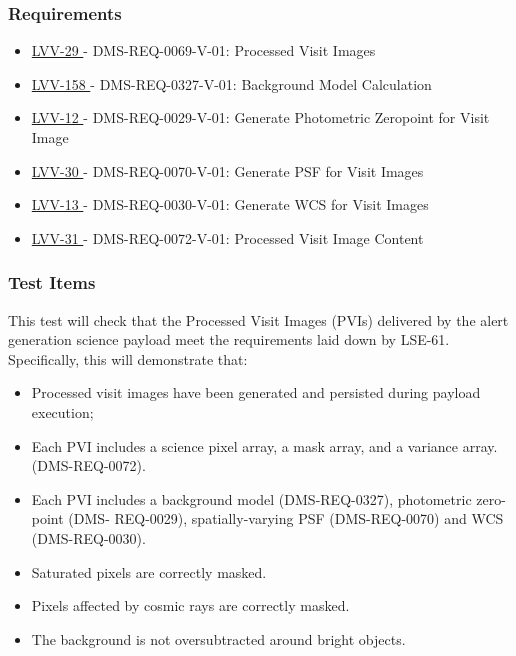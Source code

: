 \subsubsection{Requirements}

\begin{itemize}

\item \href{https://jira.lsstcorp.org/browse/LVV-29}{ LVV-29 } - DMS-REQ-0069-V-01: Processed Visit Images

\item \href{https://jira.lsstcorp.org/browse/LVV-158}{ LVV-158 } - DMS-REQ-0327-V-01: Background Model Calculation

\item \href{https://jira.lsstcorp.org/browse/LVV-12}{ LVV-12 } - DMS-REQ-0029-V-01: Generate Photometric Zeropoint for Visit Image

\item \href{https://jira.lsstcorp.org/browse/LVV-30}{ LVV-30 } - DMS-REQ-0070-V-01: Generate PSF for Visit Images

\item \href{https://jira.lsstcorp.org/browse/LVV-13}{ LVV-13 } - DMS-REQ-0030-V-01: Generate WCS for Visit Images

\item \href{https://jira.lsstcorp.org/browse/LVV-31}{ LVV-31 } - DMS-REQ-0072-V-01: Processed Visit Image Content

\end{itemize}


\subsubsection{Test Items}

This test will check that the Processed Visit Images (PVIs) delivered by
the alert generation science payload meet the requirements laid down by
LSE-61.\\
Specifically, this will demonstrate that:

\begin{itemize}
\tightlist
\item
  Processed visit images have been generated and persisted during
  payload execution;
\item
  Each PVI includes a science pixel array, a mask array, and a variance
  array. (DMS-REQ-0072).
\item
  Each PVI includes a background model (DMS-REQ-0327), photometric
  zero-point (DMS- REQ-0029), spatially-varying PSF (DMS-REQ-0070) and
  WCS (DMS-REQ-0030).
\item
  Saturated pixels are correctly masked.
\item
  Pixels affected by cosmic rays are correctly masked.
\item
  The background is not oversubtracted around bright objects.
\end{itemize}

